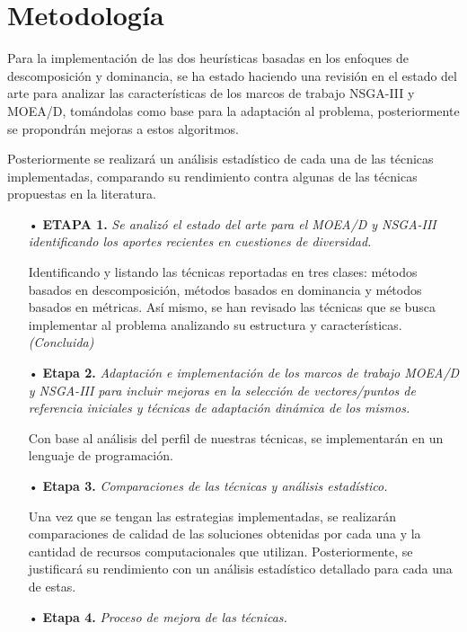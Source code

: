\documentclass[letterpaper,10pt]{article}
\begin{document}
\section{Metodología}

Para la implementación de las dos heurísticas basadas en los enfoques de descomposición y dominancia, se ha estado haciendo una revisión en el estado del arte para analizar las características de los marcos de trabajo NSGA-III y MOEA/D, tomándolas  como  base para la adaptación al problema, posteriormente se propondrán mejoras a estos algoritmos.
 
Posteriormente se realizará un análisis estadístico de cada una de las técnicas implementadas, comparando su rendimiento contra algunas de las  técnicas propuestas en la literatura.
 
 \begin{itemize}
 \item[•] \textbf{ETAPA 1.} \emph{Se analizó el estado del arte para el MOEA/D y NSGA-III identificando los aportes recientes en cuestiones de diversidad.}
\item[] Identificando y listando las técnicas reportadas en tres clases: métodos basados en descomposición, métodos basados en dominancia y métodos basados en métricas. Así mismo, se han revisado las técnicas que se busca implementar al problema analizando su estructura y características.
\emph{(Concluida)}

\item[•] \textbf{Etapa 2.} \emph{Adaptación e implementación de los marcos de trabajo MOEA/D y NSGA-III para incluir mejoras en la selección de vectores/puntos de referencia iniciales y técnicas de adaptación dinámica de los mismos.}

\item[] Con base al análisis del perfil de nuestras técnicas, se implementarán en un lenguaje de programación.
        
\item[•] \textbf{Etapa 3.} \emph{Comparaciones de las técnicas y análisis estadístico.}

\item [] Una vez que se tengan las estrategias implementadas, se realizarán comparaciones de calidad de las soluciones obtenidas por cada una y la cantidad de recursos computacionales  que utilizan. Posteriormente, se justificará su rendimiento con un análisis estadístico detallado para cada  una de estas.

\item[•] \textbf{Etapa 4.} \emph{Proceso de mejora de las técnicas.}


\end{itemize}
\end{document}
